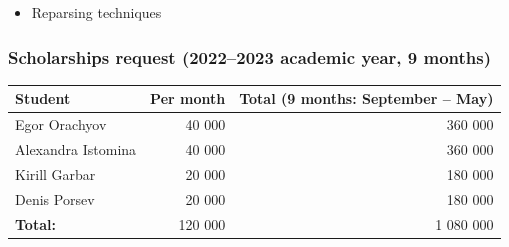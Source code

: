 \documentclass[xcolor=table,aspectratio=169]{beamer}
\begin{document}
\begin{frame}[fragile]
\begin{minipage}[t]{0.48\textwidth}
\begin{itemize}
      \item Reparsing techniques
    \end{itemize}
  \end{minipage}
\end{frame}

\begin{frame}[fragile]
  \frametitle{Scholarships request (2022--2023 academic year, 9 months)}
    \begin{center}
      \begin{tabular} {l  r  r} 
        Student & Per month & Total (9 months: September -- May)\\
        \hline
        Egor Orachyov & 40 000      & 360 000 \\
        Alexandra Istomina & 40 000      & 360 000 \\
        Kirill Garbar & 20 000     & 180 000 \\
        Denis Porsev & 20 000      & 180 000 \\
        \hline 
        \textbf{Total:} & 120 000 & 1 080 000 
      \end{tabular}
    \end{center}
\end{frame}
\end{document}

